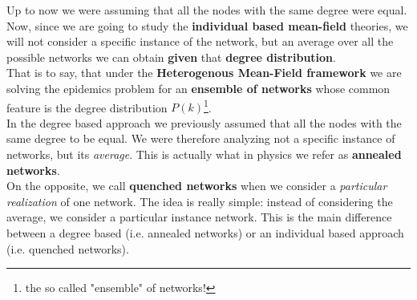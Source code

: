 \documentclass[../main/main.tex]{subfiles}
\begin{document}
Up to now we were assuming that all the nodes with the same degree were equal. Now, since we are going to study the \textbf{individual based mean-field} theories, we will not consider a specific instance of the network, but an average over all the possible networks we can obtain \textbf{given} that \textbf{degree distribution}.\\
That is to say, that under the \textbf{Heterogenous Mean-Field framework} we are solving the epidemics problem for an \textbf{ensemble of networks} whose common feature is the degree distribution \( P(k) \)\footnote{the so called "ensemble" of networks!}.\\

In the degree based approach we previously assumed that all the nodes with the same degree to be equal. We were therefore analyzing not a specific instance of networks, but its \textit{average}. This is actually what in physics we refer as \textbf{annealed networks}.\\
On the opposite, we call \textbf{quenched networks} when we consider a \textit{particular realization} of one network. The idea is really simple: instead of considering the average, we consider a particular instance network. This is the main difference between a degree based (i.e. annealed networks) or an individual based approach (i.e. quenched networks).

\medskip
\end{document}
